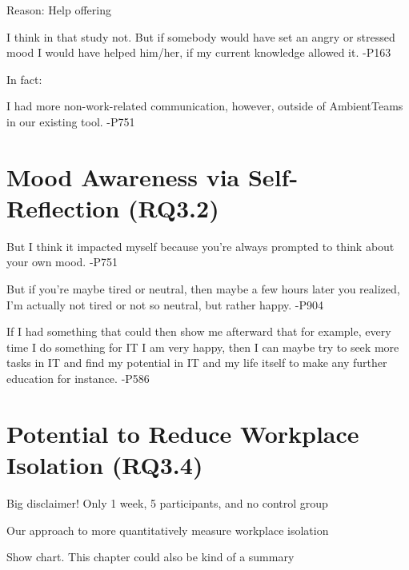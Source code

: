 Reason: Help offering

\begin{displayquote}
    I think in that study not. But if somebody would have set an angry or stressed mood I would have helped him/her, if my current knowledge allowed it. -P163
\end{displayquote}

In fact:

\begin{displayquote}
    I had more non-work-related communication, however, outside of AmbientTeams in our existing tool. -P751
\end{displayquote}

\section{Mood Awareness via Self-Reflection (RQ3.2)}

\begin{displayquote}
    But I think it impacted myself because you're always prompted to think about your own mood. -P751
\end{displayquote}

\begin{displayquote}
    But if you're maybe tired or neutral, then maybe a few hours later you realized, I'm actually not tired or not so neutral, but rather happy. -P904
\end{displayquote}

\begin{displayquote}
    If I had something that could then show me afterward that for example, every time I do something for IT I am very happy, then I can maybe try to seek more tasks in IT and find my potential in IT and my life itself to make any further education for instance. -P586
\end{displayquote}

\section{Potential to Reduce Workplace Isolation (RQ3.4)}
\label{section:workplace_isolation}
Big disclaimer! Only 1 week, 5 participants, and no control group

Our approach to more quantitatively measure workplace isolation

Show chart. This chapter could also be kind of a summary